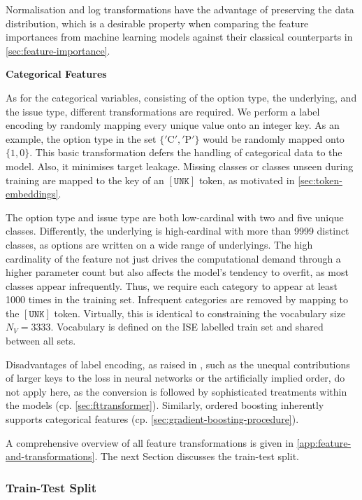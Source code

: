Normalisation and log transformations have the advantage of preserving the data distribution, which is a desirable property when comparing the feature importances from machine learning models against their classical counterparts in \cref{sec:feature-importance}.

\textbf{Categorical Features}

As for the categorical variables, consisting of the option type, the underlying, and the issue type, different transformations are required. We perform a label encoding by randomly mapping every unique value onto an integer key. As an example, the option type in the set $\{\mathrm{'C'},\mathrm{'P'}\}$ would be randomly mapped onto $\{1,0\}$. This basic transformation defers the handling of categorical data to the model. Also, it minimises target leakage. Missing classes or classes unseen during training are mapped to the key of an $\mathtt{[UNK]}$ \gls{token}, as motivated in \cref{sec:token-embeddings}.

The option type and issue type are both low-cardinal with two and five unique classes. Differently, the underlying is high-cardinal with more than \num{9999} distinct classes, as options are written on a wide range of underlyings. The high cardinality of the feature not just drives the computational demand through a higher parameter count but also affects the model's tendency to overfit, as most classes appear infrequently. Thus, we require each category to appear at least \num{1000} times in the training set. Infrequent categories are removed by mapping to the $\mathtt{[UNK]}$ \gls{token}. Virtually, this is identical to constraining the vocabulary size $N_V = \num{3333}$. Vocabulary is defined on the \gls{ISE} labelled train set and shared between all sets.

Disadvantages of label encoding, as raised in \textcite[][12]{hancockSurveyCategoricalData2020}, such as the unequal contributions of larger keys to the loss in neural networks or the artificially implied order, do not apply here, as the conversion is followed by sophisticated treatments within the models (cp. \cref{sec:fttransformer}). Similarly, ordered boosting inherently supports categorical features (cp. \cref{sec:gradient-boosting-procedure}).

A comprehensive overview of all feature transformations is given in \cref{app:feature-and-transformations}. The next Section discusses the train-test split.

\subsubsection{Train-Test Split}\label{sec:train-test-split}

